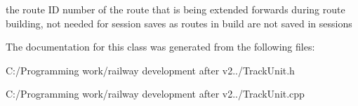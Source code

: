 the route ID number of the route that is being extended forwards during route building, not needed for session saves as routes in build are not saved in sessions 

The documentation for this class was generated from the following files\+:\begin{DoxyCompactItemize}
\item 
C\+:/\+Programming work/railway development after v2../Track\+Unit.\+h\item 
C\+:/\+Programming work/railway development after v2../Track\+Unit.\+cpp\end{DoxyCompactItemize}
